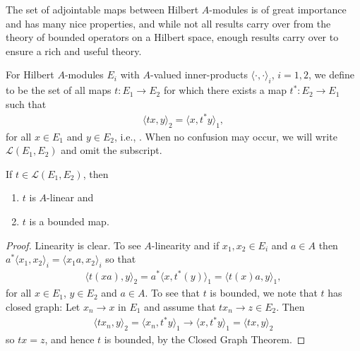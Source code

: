 The set of adjointable maps between Hilbert $A$-modules is of great importance and has many nice properties, and while not all results carry over from the theory of bounded operators on a Hilbert space, enough results carry over to ensure a rich and useful theory. 
\begin{definition}
	For Hilbert $A$-modules $E_i$ with $A$-valued inner-products $\langle \cdot , \cdot\rangle_i$, $i=1,2$, we define  to be the set of all maps $t \colon E_1 \to E_2$ for which there exists a map $t^* \colon E_2 \to E_1$ such that
	\begin{align*}
		\langle tx, y \rangle_2 = \langle x , t^*y \rangle_1,
	\end{align*}
	for all $x \in E_1$ and $y \in E_2$, i.e., . When no confusion may occur, we will write $\mathcal{L}(E_1,E_2)$ and omit the subscript.
\end{definition}
\begin{proposition}
	If $t \in \mathcal{L}(E_1,E_2)$, then
\begin{enumerate}
	\item $t$ is $A$-linear and\\
	\item $t$ is a bounded map.
\end{enumerate}
\end{proposition}
\begin{proof}
	Linearity is clear. To see $A$-linearity and if $x_1,x_2 \in E_i$ and $a \in A$ then $a^* \langle x_1,x_2\rangle_i = \langle x_1 a , x_2\rangle_i$ so that 
	\begin{align*}
		\langle t(xa) , y \rangle_2 = a^* \langle x,t^*(y)\rangle_1 = \langle t(x)a,y\rangle_1,
	\end{align*}
	for all $x \in E_1$, $y \in E_2$ and $a \in A$. To see that $t$ is bounded, we note that $t$ has closed graph: Let $x_n \to x$ in $E_1$ and assume that $tx_n \to z \in E_2$. Then
	\begin{align*}
		\langle tx_n , y\rangle_2  = \langle x_n, t^*y\rangle_1 \to \langle x, t^*y \rangle_1 = \langle tx,y\rangle_2
	\end{align*}
	so $tx = z$, and hence $t$ is bounded, by the Closed Graph Theorem.
\end{proof}

